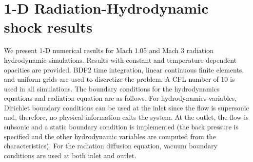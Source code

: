 \documentclass[times,doublespace]{fldauth}%
\begin{document}
\section{1-D Radiation-Hydrodynamic shock results}
\label{sec:num-rslt}
%
We present 1-D numerical results for Mach 1.05 and Mach 3 radiation hydrodynamic simulations. Results with constant and temperature-dependent opacities
are provided. BDF2 time integration, linear continuous finite elements, and uniform grids are used to discretize the problem. A CFL number of 10 is 
used in all simulations. 
The boundary conditions for the hydrodynamics equations and radiation equation are as follows. For hydrodynamics variables, Dirichlet boundary conditions can be used
at the inlet since the flow is supersonic and, therefore, no physical information exits the system. At the outlet, the flow is subsonic and a static 
 boundary condition is implemented (the back pressure is specified and the other hydrodynamic variables are computed from the characteristics). 
For the radiation diffusion equation, vacuum boundary conditions are used at both inlet and outlet. 
%
\end{document}

